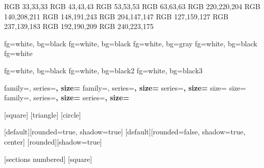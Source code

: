 
\definecolor{black}   {RGB} {33,33,33}
\definecolor{black2}  {RGB} {43,43,43}
\definecolor{black3}  {RGB} {53,53,53}
\definecolor{gray}    {RGB} {63,63,63}
\definecolor{white}   {RGB} {220,220,204}
\definecolor{cyan}    {RGB} {140,208,211}
\definecolor{blue}    {RGB} {148,191,243}
\definecolor{red}     {RGB} {204,147,147} 
\definecolor{green}   {RGB} {127,159,127}
\definecolor{magenta} {RGB} {237,139,183}
\definecolor{purple}  {RGB} {192,190,209}
\definecolor{yellow}  {RGB} {240,223,175}


          {fg=white, bg=black}
     {fg=white, bg=black}
    {fg=white, bg=gray} 
           {fg=white, bg=black} 
 {fg=white}

   {fg=white, bg=black}
 {fg=white, bg=black2}
      {fg=white, bg=black3}

          {family=\sffamily, series=\bfseries, size=\Large}
       {family=\sffamily, series=\bfseries, size=\large}
         {series=\bfseries, size=\normalsize}
      {size=\small}
           {size=\scriptsize}
     {family=\sffamily, series=\bfseries, size=\Large}
 {series=\bfseries, size=\normalsize}


[square]
[triangle]
[circle]


[default][rounded=true, shadow=true]
[default][rounded=false, shadow=true, center]
[rounded][shadow=true] 


[sections numbered]
[square]


